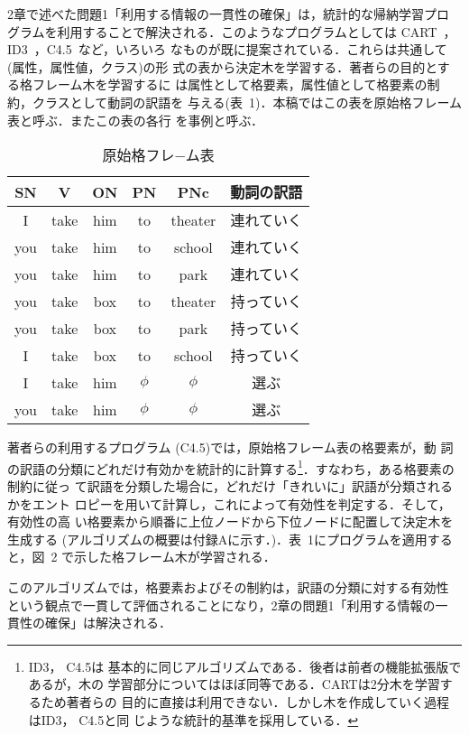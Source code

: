 2章で述べた問題1「利用する情報の一貫性の確保」は，統計的な帰納学習プロ
グラムを利用することで解決される．このようなプログラムとしては
CART~\cite{Brei84}，ID3~\cite{Qui86}，C4.5~\cite{Qui93}など，いろいろ
なものが既に提案されている．これらは共通して(属性，属性値，クラス)の形
式の表から決定木を学習する．著者らの目的とする格フレーム木を学習するに
は属性として格要素，属性値として格要素の制約，クラスとして動詞の訳語を
与える(表~1)．本稿ではこの表を原始格フレーム表と呼ぶ．またこの表の各行
を事例と呼ぶ．
\begin{table}
  \begin{center}
    \caption{原始格フレ−ム表}
    \begin{tabular}{ccccc|c}\hline\hline
      SN & V & ON & PN & PNc & 動詞の訳語\\\hline
      I & take & him & to & theater & 連れていく\\
      you & take & him & to & school & 連れていく\\
      you & take & him & to & park & 連れていく\\
      you & take & box & to & theater & 持っていく\\
      you & take & box & to & park & 持っていく\\
      I & take & box & to & school & 持っていく\\
      I & take & him & $ \phi $ & $ \phi $ &  選ぶ\\
      you & take & him & $ \phi $ & $ \phi $ &  選ぶ\\\hline
    \end{tabular}
  \end{center}
\end{table}

著者らの利用するプログラム (C4.5)では，原始格フレーム表の格要素が，動
詞の訳語の分類にどれだけ有効かを統計的に計算する\footnote{ID3， C4.5は
  基本的に同じアルゴリズムである．後者は前者の機能拡張版であるが，木の
  学習部分についてはほぼ同等である．CARTは2分木を学習するため著者らの
  目的に直接は利用できない．しかし木を作成していく過程はID3， C4.5と同
  じような統計的基準を採用している．}．すなわち，ある格要素の制約に従っ
て訳語を分類した場合に，どれだけ「きれいに」訳語が分類されるかをエント
ロピーを用いて計算し，これによって有効性を判定する．そして，有効性の高
い格要素から順番に上位ノードから下位ノードに配置して決定木を生成する
(アルゴリズムの概要は付録Aに示す．)．表~1にプログラムを適用すると，図~2
で示した格フレーム木が学習される．

このアルゴリズムでは，格要素およびその制約は，訳語の分類に対する有効性
という観点で一貫して評価されることになり，2章の問題1「利用する情報の一
貫性の確保」は解決される．

